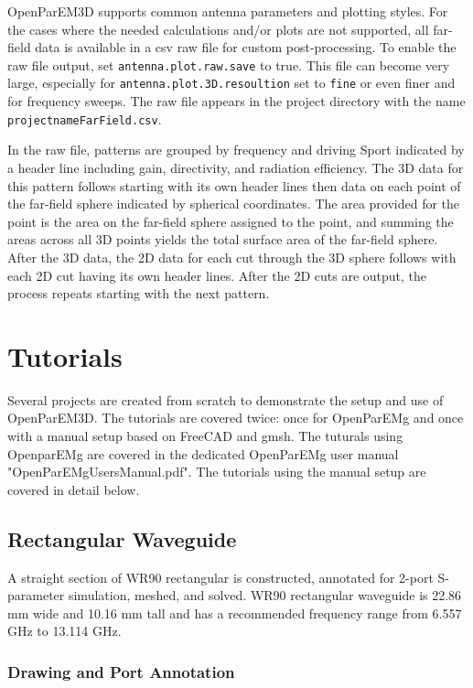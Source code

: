 \documentclass[titlepage]{article}
\renewcommand\_{\textunderscore\linebreak[1]}
\begin{document}
OpenParEM3D supports common antenna parameters and plotting styles.  For the cases where the needed calculations and/or plots are not supported, all far-field data is available in a csv raw file for custom post-processing.  To enable the raw file output, set \texttt{antenna.plot.raw.save} to true.  This file can become very large, especially for \texttt{antenna.plot.3D.resoultion} set to \texttt{fine} or even finer and for frequency sweeps.  The raw file appears in the project directory with the name \texttt{projectname\_FarField.csv}.

In the raw file, patterns are grouped by frequency and driving Sport indicated by a header line including gain, directivity, and radiation efficiency.  The 3D data for this pattern follows starting with its own header lines then data on each point of the far-field sphere indicated by spherical coordinates.  The area provided for the point is the area on the far-field sphere assigned to the point, and summing the areas across all 3D points yields the total surface area of the far-field sphere.  After the 3D data, the 2D data for each cut through the 3D sphere follows with each 2D cut having its own header lines.  After the 2D cuts are output, the process repeats starting with the next pattern.

\section{Tutorials}
\label{sec:tutorials}

Several projects are created from scratch to demonstrate the setup and use of OpenParEM3D.  The tutorials are covered twice: once for OpenParEMg and once with a manual setup based on FreeCAD and gmsh.  The tuturals using OpenparEMg are covered in the dedicated OpenParEMg user manual "OpenParEMg\_Users\_Manual.pdf".  The tutorials using the manual setup are covered in detail below.

\subsection{Rectangular Waveguide}
A straight section of WR90 rectangular is constructed, annotated for 2-port S-parameter simulation, meshed, and solved.  WR90 rectangular waveguide is 22.86 mm wide and 10.16 mm tall and has a recommended frequency range from 6.557 GHz to 13.114 GHz.

\subsubsection{Drawing and Port Annotation}
\end{document}
